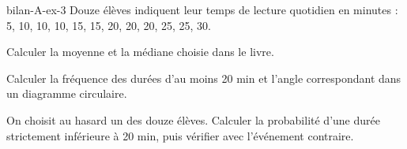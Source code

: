 \begin{blocEdition}{bilan-A-ex-3}
Douze élèves indiquent leur temps de lecture quotidien en minutes : 5, 10, 10, 10, 15, 15, 20, 20, 20, 25, 25, 30.\begin{questions}
\item Calculer la moyenne et la médiane choisie dans le livre.
\item Calculer la fréquence des durées d’au moins 20 min et l’angle correspondant dans un diagramme circulaire.
\item On choisit au hasard un des douze élèves. Calculer la probabilité d’une durée strictement inférieure à 20 min, puis vérifier avec l’événement contraire.
\end{questions}\par{}\par\par{}\par{}\par{}\par{}\par{}\par{}
\end{blocEdition}

